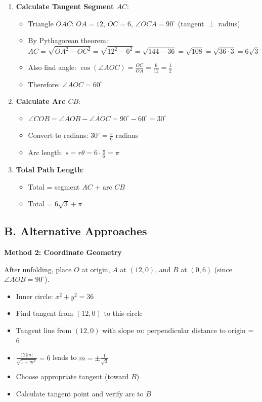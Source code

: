 \documentclass[12pt]{article}
\begin{document}
\begin{solutionbox}
\begin{enumerate}[leftmargin=*]
    \item \textbf{Calculate Tangent Segment $AC$}: 
    \begin{itemize}
        \item Triangle $OAC$: $OA = 12$, $OC = 6$, $\angle OCA = 90^\circ$ (tangent $\perp$ radius)
        \item By Pythagorean theorem:
        \[AC = \sqrt{OA^2 - OC^2} = \sqrt{12^2 - 6^2} = \sqrt{144 - 36} = \sqrt{108} = \sqrt{36 \cdot 3} = 6\sqrt{3}\]
        \item Also find angle: $\cos(\angle AOC) = \frac{OC}{OA} = \frac{6}{12} = \frac{1}{2}$
        \item Therefore: $\angle AOC = 60^\circ$
    \end{itemize}
    
    \item \textbf{Calculate Arc $CB$}: 
    \begin{itemize}
        \item $\angle COB = \angle AOB - \angle AOC = 90^\circ - 60^\circ = 30^\circ$
        \item Convert to radians: $30^\circ = \frac{\pi}{6}$ radians
        \item Arc length: $s = r\theta = 6 \cdot \frac{\pi}{6} = \pi$
    \end{itemize}
    
    \item \textbf{Total Path Length}: 
    \begin{itemize}
        \item Total = segment $AC$ + arc $CB$
        \item Total = $6\sqrt{3} + \pi$
    \end{itemize}
\end{enumerate}

\subsection*{B. Alternative Approaches}

\textbf{Method 2: Coordinate Geometry}

After unfolding, place $O$ at origin, $A$ at $(12, 0)$, and $B$ at $(0, 6)$ (since $\angle AOB = 90^\circ$).

\begin{itemize}
    \item Inner circle: $x^2 + y^2 = 36$
    \item Find tangent from $(12, 0)$ to this circle
    \item Tangent line from $(12, 0)$ with slope $m$: perpendicular distance to origin = 6
    \item $\frac{12|m|}{\sqrt{1 + m^2}} = 6$ leads to $m = \pm\frac{1}{\sqrt{3}}$
    \item Choose appropriate tangent (toward $B$)
    \item Calculate tangent point and verify arc to $B$
\end{itemize}


\end{solutionbox}
\end{document}
